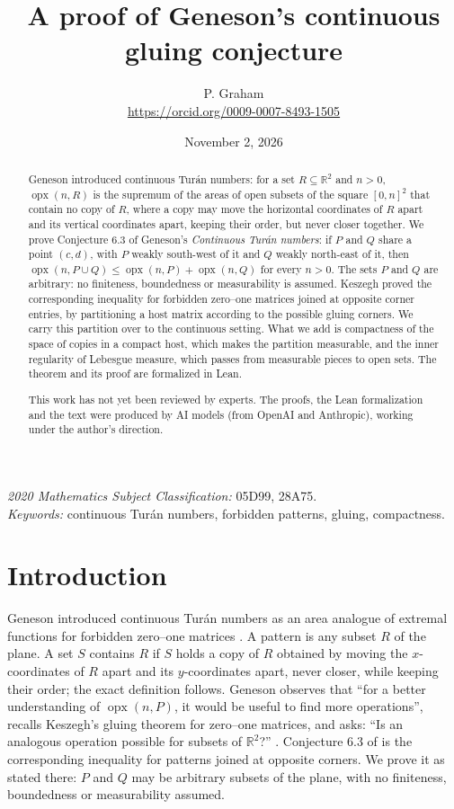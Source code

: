 \documentclass[11pt]{article}
\title{A proof of Geneson's continuous gluing conjecture}
\author{P. Graham\\ \small\url{https://orcid.org/0009-0007-8493-1505}}
\date{November 2, 2026}
\DeclareMathOperator{\opx}{opx}
\newcommand{\R}{\mathbb R}
\begin{document}
\maketitle
\begin{abstract}
Geneson introduced continuous Tur\'an numbers: for a set $R\subseteq\R^2$ and $n>0$, $\opx(n,R)$ is the supremum of the areas of open subsets of the square $[0,n]^2$ that contain no copy of $R$, where a copy may move the horizontal coordinates of $R$ apart and its vertical coordinates apart, keeping their order, but never closer together. We prove Conjecture 6.3 of Geneson's \emph{Continuous Tur\'an numbers}: if $P$ and $Q$ share a point $(c,d)$, with $P$ weakly south-west of it and $Q$ weakly north-east of it, then $\opx(n,P\cup Q)\le\opx(n,P)+\opx(n,Q)$ for every $n>0$. The sets $P$ and $Q$ are arbitrary: no finiteness, boundedness or measurability is assumed. Keszegh proved the corresponding inequality for forbidden zero--one matrices joined at opposite corner entries, by partitioning a host matrix according to the possible gluing corners. We carry this partition over to the continuous setting. What we add is compactness of the space of copies in a compact host, which makes the partition measurable, and the inner regularity of Lebesgue measure, which passes from measurable pieces to open sets. The theorem and its proof are formalized in Lean.

This work has not yet been reviewed by experts. The proofs, the Lean formalization and the text were produced by AI models (from OpenAI and Anthropic), working under the author's direction.
\end{abstract}
\medskip
\noindent\textit{2020 Mathematics Subject Classification:} 05D99, 28A75.\\
\textit{Keywords:} continuous Tur\'an numbers, forbidden patterns, gluing, compactness.

\section{Introduction}
Geneson introduced continuous Tur\'an numbers as an area analogue of extremal functions for forbidden zero--one matrices \cite{Geneson}. A pattern is any subset $R$ of the plane. A set $S$ contains $R$ if $S$ holds a copy of $R$ obtained by moving the $x$-coordinates of $R$ apart and its $y$-coordinates apart, never closer, while keeping their order; the exact definition follows. Geneson observes that ``for a better understanding of $\opx(n,P)$, it would be useful to find more operations'', recalls Keszegh's gluing theorem for zero--one matrices, and asks: ``Is an analogous operation possible for subsets of $\R^2$?'' \cite[p.~32]{Geneson}. Conjecture 6.3 of \cite{Geneson} is the corresponding inequality for patterns joined at opposite corners. We prove it as stated there: $P$ and $Q$ may be arbitrary subsets of the plane, with no finiteness, boundedness or measurability assumed.
\end{document}
